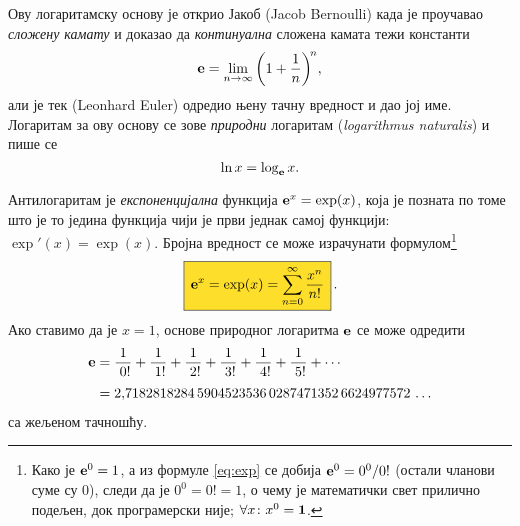 Ову логаритамску основу је открио Јакоб  (Jacob Bernoulli) када је
проучавао {\sl сложену камату\/} и доказао да {\sl континуална\/} сложена камата
тежи константи
\begin{equation}\label{eq:elim}
\e=\lim_{n\to\infty}\left(1+\frac1n\right)^{\!n}\!,\index{лимес}
\end{equation}
али је тек  (Leonhard Euler)
одредио њену тачну вредност и дао јој име.
Логаритам за ову основу се зове
{\sl природни\/} логаритам ({\sl logarithmus naturalis\/})
и пише се
$$
\ln x=\log_{\bf e} x.
$$

\def\ep{\hphantom{!}}%
\def\rf#1!{\frac1{\hphantom{!}#1!}}%
Антилогаритам је {\sl експоненцијална\/} функција ${\bf e}^x=\exp(x)$, 
која је позната по томе што је то
једина функција чији је први
 једнак самој функцији: $\exp'(x)=\exp(x)$. 
Бројна вредност се може израчунати формулом\footnote{Како је ${\bf e}^0=1$, а из формуле \eqref{eq:exp} се добија
${\bf e}^0=0^0/0!$ (остали чланови суме су 0), следи да је $0^0=0!=1$, 
о чему је математички свет прилично подељен, док програмерски није; $\forall x\colon x^0={\bf1}$.}
\begin{equation}
\label{eq:exp}\index{формула}
\okvir{\e^x=\exp(x)=\sum_{n=0}^\infty\frac{x^n}{n!}}.
\end{equation}%
Ако ставимо да је $x=1$,
 основе природног логаритма ${\bf e}$ се може одредити
\begin{equation}\label{eq:e}
\begin{split}
\e
&=\rf0!+\rf1!+\rf2!+\rf3!+\rf4!+\rf5!+\cdots\\
\noalign{\smallskip}
&=2\.
7182818284\,
5904523536\,
0287471352\,
6624977572\,\ldots
\end{split}
\end{equation}
са жељеном тачношћу.
